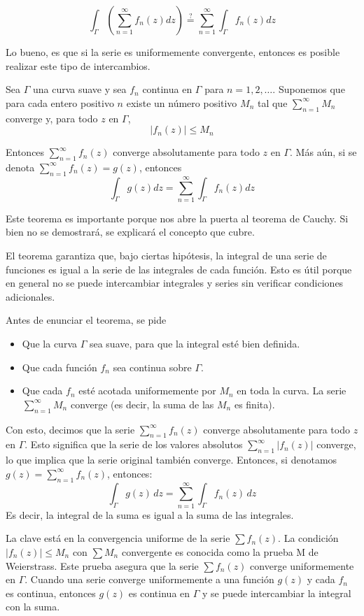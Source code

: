 \begin{equation}
  \int_\Gamma \left(\sum_{n=1}^\infty f_n(z)dz \right) \stackrel{?}{=} \sum_{n=1}^\infty \int_\Gamma f_n(z)dz
\end{equation}

Lo bueno, es que si la serie es uniformemente convergente, entonces es posible realizar este tipo de intercambios.

\begin{theorem}
  Sea $\Gamma$ una curva suave y sea $f_n$ continua en $\Gamma$ para $n=1,2,\dots$. Suponemos que para cada entero positivo $n$ existe un número positivo $M_n$ tal que $\sum_{n=1}^\infty M_n$ converge y, para todo $z$ en $\Gamma$,
  $$
  \lvert f_n(z) \rvert \leqslant M_n
  $$

  Entonces $\sum_{n=1}^\infty f_n(z)$ converge absolutamente para todo $z$ en $\Gamma$. Más aún, si se denota $\sum_{n=1}^\infty f_n(z)=g(z)$, entonces
  $$
  \int_\Gamma g(z)dz = \sum_{n=1}^\infty \int_\Gamma f_n(z)dz
  $$
\end{theorem}

Este teorema es importante porque nos abre la puerta al teorema de Cauchy. Si bien no se demostrará, se explicará el concepto que cubre.

El teorema garantiza que, bajo ciertas hipótesis, la integral de una serie de funciones es igual a la serie de las integrales de cada función. Esto es útil porque en general no se puede intercambiar integrales y series sin verificar condiciones adicionales.

Antes de enunciar el teorema, se pide 
\begin{itemize}
  \item Que la curva $\Gamma$ sea suave, para que la integral esté bien definida.
  \item Que cada función $f_n$ sea continua sobre $\Gamma$.
  \item Que cada $f_n$ esté acotada uniformemente por $M_n$ en toda la curva. La serie \(\sum_{n=1}^\infty M_n\) converge (es decir, la suma de las \(M_n\) es finita).
\end{itemize}

Con esto, decimos que la serie \(\sum_{n=1}^\infty f_n(z)\) converge absolutamente para todo \(z\) en \(\Gamma\). Esto significa que la serie de los valores absolutos \(\sum_{n=1}^\infty |f_n(z)|\) converge, lo que implica que la serie original también converge. Entonces, si denotamos \(g(z) = \sum_{n=1}^\infty f_n(z)\), entonces:
\[
  \int_\Gamma g(z) \, dz = \sum_{n=1}^\infty \int_\Gamma f_n(z) \, dz
\]
Es decir, la integral de la suma es igual a la suma de las integrales.

La clave está en la convergencia uniforme de la serie \(\sum f_n(z)\). La condición \(|f_n(z)| \leq M_n\) con \(\sum M_n\) convergente es conocida como la prueba M de Weierstrass. Este prueba asegura que la serie \(\sum f_n(z)\) converge uniformemente en \(\Gamma\). Cuando una serie converge uniformemente a una función \(g(z)\) y cada \(f_n\) es continua, entonces \(g(z)\) es continua en \(\Gamma\) y se puede intercambiar la integral con la suma.
